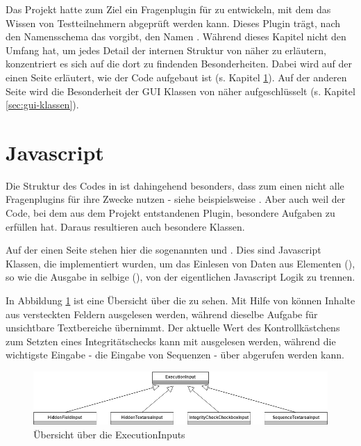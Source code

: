 Das  Projekt hatte zum Ziel ein Fragenplugin für  zu entwickeln, mit dem das  Wissen von Testteilnehmern abgeprüft werden kann. Dieses Plugin trägt, nach den Namensschema das  vorgibt, den Namen . 
Während dieses Kapitel nicht den Umfang hat, um jedes Detail der internen Struktur von  näher zu erläutern, konzentriert es sich auf die dort zu findenden Besonderheiten. Dabei wird auf der einen Seite erläutert, wie der  Code aufgebaut ist (s. Kapitel \ref{sec:javascript}). Auf der anderen Seite wird die Besonderheit der GUI Klassen von  näher aufgeschlüsselt (s. Kapitel \ref{sec:gui-klassen}).

\section{Javascript}
\label{sec:javascript}

Die Struktur des  Codes in  ist dahingehend besonders, dass zum einen nicht alle  Fragenplugins  für ihre Zwecke nutzen - siehe beispielsweise . Aber auch weil der  Code, bei dem aus dem  Projekt entstandenen Plugin, besondere Aufgaben zu erfüllen hat. Daraus resultieren auch besondere Klassen.

Auf der einen Seite stehen hier die sogenannten  und . Dies sind Javascript Klassen, die implementiert wurden, um das Einlesen von Daten aus  Elementen (), so wie die Ausgabe in selbige (), von der eigentlichen Javascript Logik zu trennen.

In Abbildung \ref{fig:execution-inputs} ist eine Übersicht über die  zu sehen. Mit Hilfe von  können Inhalte aus versteckten Feldern ausgelesen werden, während  dieselbe Aufgabe für unsichtbare Textbereiche übernimmt. Der aktuelle Wert des Kontrollkästchens zum Setzten eines Integritätschecks kann mit  ausgelesen werden, während die wichtigste Eingabe - die Eingabe von  Sequenzen - über  abgerufen werden kann.

    \begin{figure}[H]
        \begin{center}
            \includegraphics[page=1, width=0.7\paperwidth, trim=0 0 0 0, clip]{fig/ExecutionInputs.png} 
            \caption{Übersicht über die ExecutionInputs}
            \label{fig:execution-inputs}
        \end{center}
    \end{figure}
    
